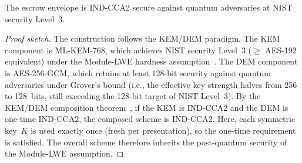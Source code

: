 \begin{theorem}\label{thm:pq-security}
  The escrow envelope is IND-CCA2 secure against quantum adversaries
  at NIST security Level~3.
\end{theorem}

\begin{proof}[Proof sketch]
  The construction follows the KEM/DEM paradigm.
  The KEM component is ML-KEM-768, which achieves NIST security
  Level~3 ($\geq$ AES-192 equivalent) under the Module-LWE
  hardness assumption~\cite{fips203}.
  The DEM component is AES-256-GCM, which retains at least 128-bit
  security against quantum adversaries under Grover's bound
  (i.e., the effective key strength halves from 256 to 128~bits,
  still exceeding the 128-bit target of NIST Level~3).
  By the KEM/DEM composition theorem~\cite{cramer2003design}, if
  the KEM is IND-CCA2 and the DEM is one-time IND-CCA2, the
  composed scheme is IND-CCA2.  Here, each symmetric key~$K$ is
  used exactly once (fresh per presentation), so the one-time
  requirement is satisfied.  The overall scheme therefore inherits
  the post-quantum security of the Module-LWE assumption.
\end{proof}
